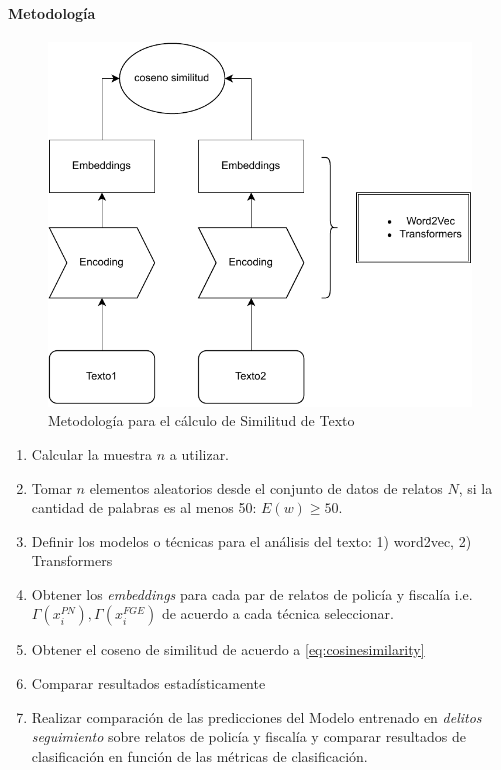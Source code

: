 \documentclass[onecolumn, journal, english, 12pt, a4paper]{IEEEtran} %
\theoremstyle{definition}
\begin{document}
\paragraph{Metodología}
\begin{figure}
    \centering
    \includegraphics[scale=.75]{imgs/CosenoSimilitud.drawio.pdf}
    \caption{Metodología para el cálculo de Similitud de Texto}
    \label{fig:metodologiaSimilitudTexto}
\end{figure}

\begin{enumerate}
        \item Calcular la muestra $n$ a utilizar.
        \item Tomar $n$ elementos aleatorios desde el conjunto de
          datos de relatos $N$, si la cantidad de palabras es al menos
          50: $E(w)\geq50$.
        \item Definir los modelos o técnicas para el análisis del
          texto: 1) word2vec, 2) Transformers
        \item Obtener los \emph{embeddings} para cada par de relatos
          de policía y fiscalía i.e.
          $\Gamma(x_i^{PN}), \Gamma(x_i^{FGE})$ de acuerdo a cada
          técnica seleccionar.
        \item Obtener el coseno de similitud de acuerdo a \eqref{eq:cosinesimilarity}
        \item Comparar resultados estadísticamente
        \item Realizar comparación de las predicciones del Modelo
          entrenado en \emph{delitos seguimiento} sobre relatos de
          policía y fiscalía y comparar resultados de clasificación en
          función de las métricas de clasificación.
\end{enumerate}
\end{document}
